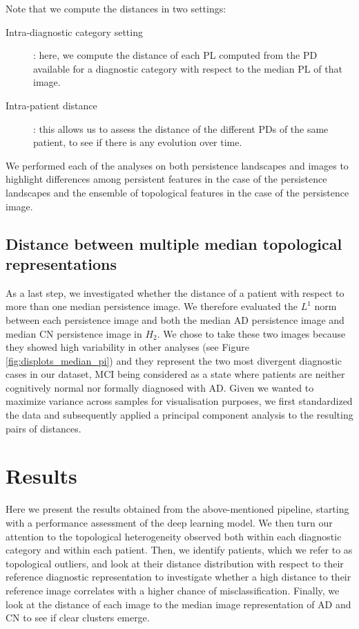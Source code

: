 \documentclass{article}
\begin{document}
Note that we compute the distances in two settings:
\begin{description}
\item[Intra-diagnostic category setting]: here, we compute the distance of each PL computed from the
  PD available for a diagnostic category with respect to the median PL of that image.
\item[Intra-patient distance]: this allows us to assess the distance of the different PDs of the
  same patient, to see if there is any evolution over time.
\end{description}
We performed each of the analyses on both persistence landscapes and images to highlight differences
among persistent features in the case of the persistence landscapes and the ensemble of topological
features in the case of the persistence image.


\subsection{Distance between multiple median topological representations}\label{sec:methods_dist_multiple_images}

As a last step, we investigated whether the distance of a patient with respect to more than one
median persistence image. We therefore evaluated the $L^1$ norm between each persistence image and
both the median AD persistence image and median CN persistence image in $H_2$. We chose
to take these two images because they showed high variability in other 
analyses (see Figure \ref{fig:displots_median_pi}) and they represent the two
most divergent diagnostic cases in our dataset, MCI being considered as a state
where patients are neither cognitively normal nor formally diagnosed with AD. Given we wanted to maximize
variance across samples for visualisation purposes, we first standardized the data and subsequently
applied a principal component analysis to the resulting pairs of distances.

\section{Results}\label{sec:results}

Here we present the results obtained from the above-mentioned pipeline, starting with a performance
assessment of the deep learning model. We then turn our attention to the topological heterogeneity
observed both within each diagnostic category and within each patient. Then, we identify
patients, which we refer to as topological outliers, and look at their distance distribution with
respect to their reference diagnostic representation to investigate whether a high distance to their
reference image correlates with a higher chance of misclassification. Finally, we look at the
distance of each image to the median image representation of AD and CN to see if clear clusters
emerge.
\end{document}

